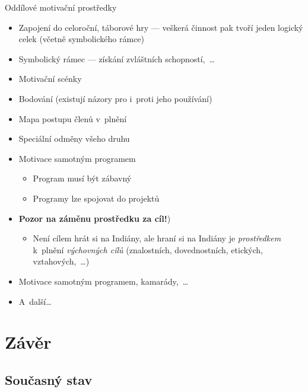 \documentclass[compress, ucs, xelatex, xcolor=dvipsnames, print,
  hyperref={
    bookmarks=true,
    unicode=true,
    colorlinks=true,
    plainpages=false,
    pdfkeywords={Junak, Pedagogika, Skaut, Skauting, Vychovna metoda},
    linkcolor=Black,
    anchorcolor=Black,
    citecolor=OliveGreen,
    filecolor=OliveGreen,
    menucolor=Black,
    urlcolor=OliveGreen,
    pdftex}
  ]{beamer}
\begin{document}
\begin{frame}{Oddílové motivační prostředky}
  \begin{itemize}
    \item Zapojení do celoroční, táborové hry --- veškerá činnost pak tvoří jeden logický celek (včetně symbolického rámce)
    \item Symbolický rámec --- získání zvláštních schopností,~\ldots
    \item Motivační scénky
    \item Bodování (existují názory pro i~proti jeho používání)
    \item Mapa postupu členů v~plnění
    \item Speciální odměny všeho druhu
    \item Motivace samotným programem
    \begin{itemize}
      \item Program musí být zábavný
      \item Programy lze spojovat do projektů
    \end{itemize}
    \item \textbf{Pozor na záměnu prostředku za cíl!})
    \begin{itemize}
      \item Není cílem hrát si na Indiány, ale hraní si na Indiány je \textit{prostředkem} k~plnění \textit{výchovných cílů} (znalostních, dovednostních, etických, vztahových,~\ldots)
    \end{itemize}
    \item Motivace samotným programem, kamarády,~\ldots
    \item A~další\ldots
  \end{itemize}
\end{frame}

\section{Závěr}

\subsection{Současný stav}
\end{document}
